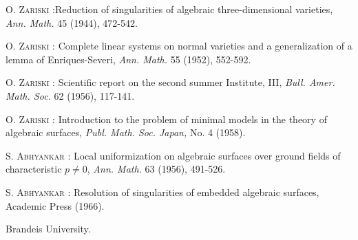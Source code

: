 \begin{thebibliography}{99}
 \textsc{O. Zariski :}\pageoriginale Reduction of singularities of algebraic three-dimensional varieties, {\em Ann. Math.} 45 (1944), 472-542.

 \textsc{O. Zariski :} Complete linear systems on normal varieties and a generalization of a lemma of Enriques-Severi, {\em Ann. Math.} 55 (1952), 552-592.

 \textsc{O. Zariski :} Scientific report on the second summer Institute, III, {\em Bull. Amer. Math. Soc.} 62 (1956), 117-141.

 \textsc{O. Zariski :} Introduction to the problem of minimal models in the theory of algebraic surfaces, {\em Publ. Math. Soc. Japan,} No. 4 (1958).

 \textsc{S. Abhyankar :} Local uniformization on algebraic surfaces over ground fields of characteristic $p\neq 0$, {\em Ann. Math.} 63 (1956), 491-526.

 \textsc{S. Abhyankar :} {\rm Resolution of singularities of embedded algebraic surfaces,} Academic Press (1966).

\end{thebibliography}

\bigskip
\noindent
{\small Brandeis University.}
